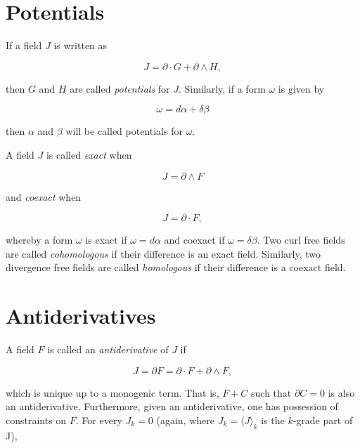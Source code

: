 \documentclass[twocolumn]{article}
\begin{document}
\section{Potentials}

If a field $J$ is written as

\begin{equation}
  J = \partial \cdot G + \partial \wedge H,
\end{equation}

then $G$ and $H$ are called \emph{potentials} for $J$. Similarly, if a form $\omega$ is given by

\begin{equation}
  \omega = d \alpha + \delta \beta
\end{equation}

then $\alpha$ and $\beta$ will be called potentials for $\omega$.

A field $J$ is called \emph{exact} when

\begin{equation}
  J = \partial \wedge F
\end{equation}

and \emph{coexact} when

\begin{equation}
  J = \partial \cdot F,
\end{equation}

whereby a form $\omega$ is exact if $\omega = d \alpha$ and coexact if $\omega = \delta \beta$. Two curl free fields are called \emph{cohomologous} if their difference is an exact field. Similarly, two divergence free fields are called \emph{homologous} if their difference is a coexact field.

\section{Antiderivatives}

A field $F$ is called an \emph{antiderivative} of $J$ if

\begin{equation}
  J = \partial F = \partial \cdot F + \partial \wedge F,\label{eq:antiderivative}
\end{equation}

which is unique up to a monogenic term. That is, $F + C$ such that $\partial C = 0$ is also an antiderivative. Furthermore, given an antiderivative, one has possession of constraints on $F$. For every $J_k = 0$ (again, where $J_k = \langle J \rangle_k$ is the $k$-grade part of J),
\end{document}
